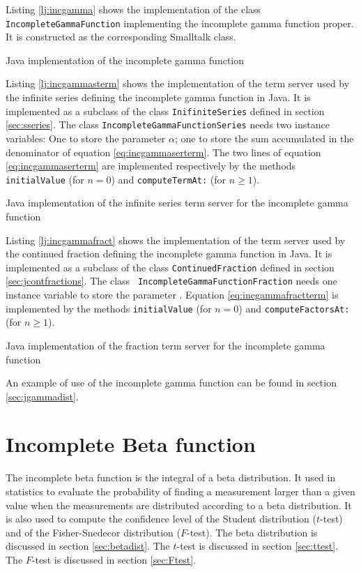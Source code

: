 \documentclass[twoside]{book}
\begin{document}
Listing \ref{lj:incgamma} shows the implementation of the class
{\tt IncompleteGammaFunction} implementing the incomplete gamma
function proper. It is constructed as the corresponding Smalltalk
class.
\begin{listing} Java implementation of the incomplete gamma function \label{lj:incgamma}

\end{listing}
Listing \ref{lj:incgammasterm} shows the implementation of the
term server used by the infinite series defining the incomplete
gamma function in Java. It is implemented as a subclass of the
class {\tt InifiniteSeries} defined in section \ref{sec:sseries}.
The class {\tt IncompleteGammaFunctionSeries} needs two instance
variables: One to store the parameter $\alpha$; one to store the
sum accumulated in the denominator of equation
\ref{eq:incgammaserterm}. The two lines of equation
\ref{eq:incgammaserterm} are implemented respectively by the
methods {\tt initialValue}  (for $n=0$) and {\tt computeTermAt:}
(for $n\ge 1$).
\begin{listing} Java implementation of the infinite series term server for the incomplete gamma function \label{lj:incgammasterm}

\end{listing}
Listing \ref{lj:incgammafract} shows the implementation of the
term server used by the continued fraction defining the incomplete
gamma function in Java. It is implemented as a subclass of the
class {\tt ContinuedFraction} defined in section
\ref{sec:jcontfractions}. The class {\tt
IncompleteGammaFunctionFraction} needs one instance variable to
store the parameter  . Equation \ref{eq:incgammafractterm} is
implemented by the methods {\tt initialValue}  (for $n=0$) and
{\tt computeFactorsAt:} (for $n\ge 1$).
\begin{listing} Java implementation of the fraction term server for the incomplete gamma function
\label{lj:incgammafract}

\end{listing}
An example of use of the incomplete gamma function can be found in
section \ref{sec:jgammadist}.

\section{Incomplete Beta function}
\label{sec:incbeta} The incomplete beta function is the integral
of a beta distribution. It used in statistics to evaluate the
probability of finding a measurement larger than a given value
when the measurements are distributed according to a beta
distribution. It is also used to compute the confidence level of
the Student distribution ($t$-test) and of the Fisher-Snedecor
distribution ($F$-test). The beta distribution is discussed in
section \ref{sec:betadist}. The $t$-test is discussed in section
\ref{sec:ttest}. The $F$-test is discussed in section
\ref{sec:Ftest}.
\end{document}

